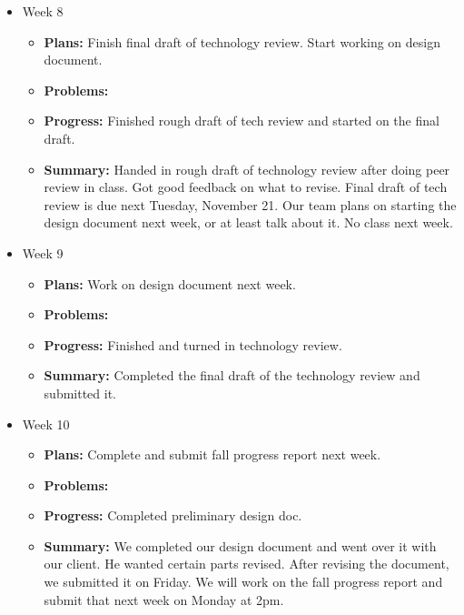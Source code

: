 \documentclass[onecolumn, draftclsnofoot,10pt, compsoc]{IEEEtran}
\begin{document}
\begin{itemize}
\begin{itemize}
	\end{itemize}
\item Week 8
	\begin{itemize}
	\item \textbf{Plans:} Finish final draft of technology review. Start working on design document.
    \item \textbf{Problems:} 
    \item \textbf{Progress:} Finished rough draft of tech review and started on the final draft.
    \item \textbf{Summary:} Handed in rough draft of technology review after doing peer review in class. Got good feedback on what to revise. Final draft of tech review is due next Tuesday, November 21. Our team plans on starting the design document next week, or at least talk about it. No class next week.
	\end{itemize}
\item Week 9
	\begin{itemize}
	\item \textbf{Plans:} Work on design document next week.
    \item \textbf{Problems:} 
    \item \textbf{Progress:} Finished and turned in technology review.
    \item \textbf{Summary:} Completed the final draft of the technology review and submitted it.
	\end{itemize}
\item Week 10
	\begin{itemize}
	\item \textbf{Plans:} Complete and submit fall progress report next week.
    \item \textbf{Problems:} 
    \item \textbf{Progress:} Completed preliminary design doc.
    \item \textbf{Summary:} We completed our design document and went over it with our client. He wanted certain parts revised. After revising the document, we submitted it on Friday. We will work on the fall progress report and submit that next week on Monday at 2pm.
	\end{itemize}
\end{itemize}
\end{document}
